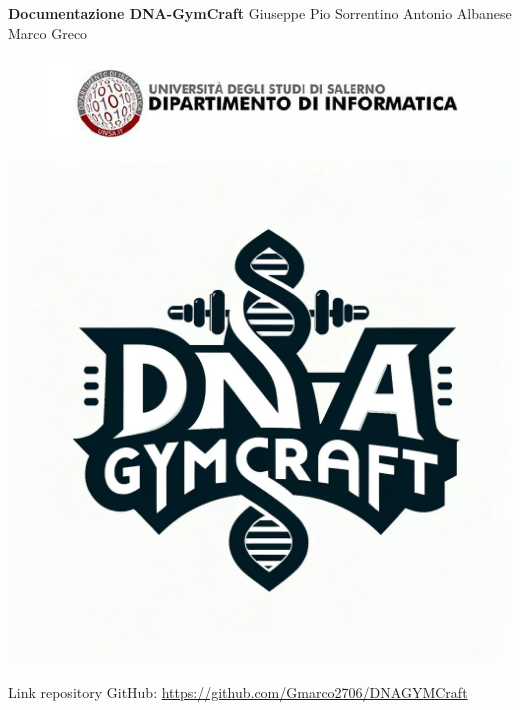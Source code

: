 \documentclass{book}
\begin{document}
\vspace*{\fill} 

\begin{center} 
    \textbf{Documentazione DNA-GymCraft} 
    \vskip 40pt
    Giuseppe Pio Sorrentino Antonio Albanese Marco Greco
\end{center}

\vspace*{\fill} 
\newpage
\begin{figure}
  \centering
  \includegraphics[width=0.8\linewidth]{dipartimento.png}
\end{figure}


  
  \includegraphics[width=0.8\linewidth]{LOGO.jpg}

\newline

Link repository GitHub: \href{https://github.com/Gmarco2706/DNAGYMCraft}{https://github.com/Gmarco2706/DNAGYMCraft}


\tableofcontents
\clearpage
\end{document}

